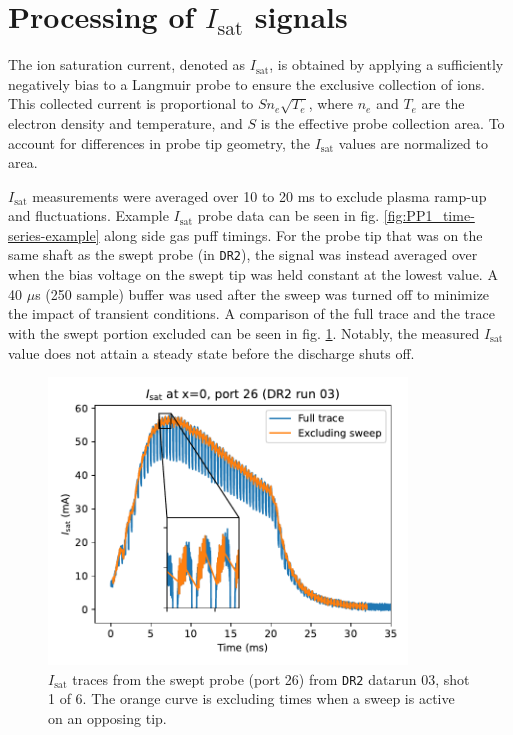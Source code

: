 \section{Processing of $I_\text{sat}$ signals}

The ion saturation current, denoted as $I_\text{sat}$, is obtained by applying a sufficiently negatively bias to a Langmuir probe to ensure the exclusive collection of ions. This collected current is proportional to $S n_e \sqrt{T_e}$, where $n_e$ and $T_e$ are the electron density and temperature, and $S$ is the effective probe collection area. To account for differences in probe tip geometry, the $I_\text{sat}$ values are normalized to area. 

$I_\text{sat}$ measurements were averaged over 10 to 20 ms to exclude plasma ramp-up and fluctuations. Example $I_\text{sat}$ probe data can be seen in fig. \ref{fig:PP1_time-series-example} along side gas puff timings.  For the probe tip that was on the same shaft as the swept probe (in \texttt{DR2}), the signal was instead averaged over when the bias voltage on the swept tip was held constant at the lowest value. A 40 $\mu$s (250 sample) buffer was used after the sweep was turned off to minimize the impact of transient conditions. A comparison of the full trace and the trace with the swept portion excluded can be seen in fig. \ref{fig:PP1_swept_probe}. Notably, the measured $I_\text{sat}$ value does not attain a steady state before the discharge shuts off. 

\begin{figure}
	\centering
	\includegraphics[width=270pt]{figures/PP1_isat_swept_probe.pdf}
	\caption[$I_\text{sat}$ traces from the swept probe]{\label{fig:PP1_swept_probe}$I_\text{sat}$ traces from the swept probe (port 26) from \texttt{DR2} datarun 03, shot 1 of 6. The orange curve is excluding times when a sweep is active on an opposing tip. }
\end{figure}

